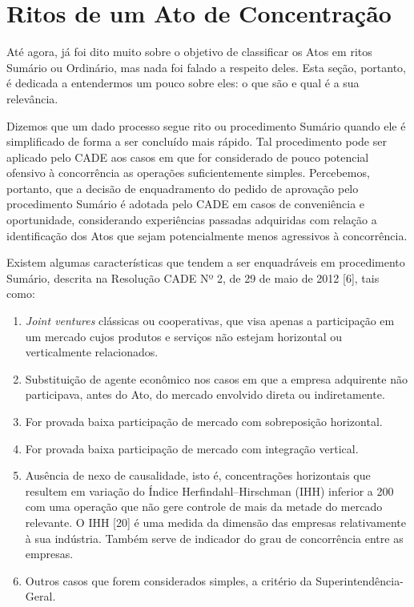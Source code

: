 \documentclass[11pt]{report}
\begin{document}
\section{Ritos de um Ato de Concentração}

\indent\indent Até agora, já foi dito muito sobre o objetivo de classificar os Atos em ritos Sumário ou Ordinário, mas nada foi falado a respeito deles. Esta seção, portanto,
é dedicada a entendermos um pouco sobre eles: o que são e  qual é a sua relevância.

\indent Dizemos que um dado processo segue rito ou procedimento Sumário quando ele é simplificado de forma a ser concluído mais rápido. Tal procedimento pode ser
aplicado pelo CADE aos casos em que for considerado de pouco potencial ofensivo à concorrência as operações suficientemente simples. Percebemos, portanto, que a decisão de enquadramento do pedido de aprovação pelo procedimento Sumário é adotada pelo CADE em casos de conveniência e oportunidade, considerando experiências passadas adquiridas com relação a identificação
dos Atos que sejam potencialmente menos agressivos à concorrência.

Existem algumas características que tendem a ser enquadráveis em procedimento Sumário, descrita na Resolução CADE Nº 2, de 29 de maio de 2012 [6], tais como:

\begin{enumerate}[label=\textbf{\Roman*.}]
\item \textit{Joint ventures} clássicas ou cooperativas, que visa apenas a participação em um mercado cujos produtos e serviços não
estejam horizontal ou verticalmente relacionados.
\item Substituição de agente econômico nos casos em que a empresa adquirente não participava, antes do Ato, do mercado envolvido direta ou indiretamente.
\item For provada baixa participação de mercado com sobreposição horizontal.
\item For provada baixa participação de mercado com integração vertical.
\item Ausência de nexo de causalidade, isto é, concentrações horizontais que resultem em variação do Índice Herfindahl–Hirschman (IHH) inferior a 200 com uma operação que não gere controle de mais da metade do mercado relevante. O IHH [20] é uma medida da dimensão das empresas relativamente à sua indústria. Também serve de indicador do grau de concorrência entre as empresas.
\item Outros casos que forem considerados simples, a critério da Superintendência-Geral.
\end{enumerate}
\end{document}
